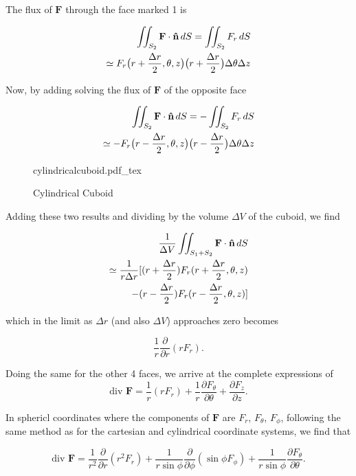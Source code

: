 \documentclass[11pt]{article}
\newcommand{\incfig}[2][1]{%
    \def\svgwidth{#1\columnwidth}
    {#2.pdf_tex}
}
\begin{document}
The flux of $\mathbf{F}$ through the face marked 1 is

\begin{align}
	 \iint_{S_2} \mathbf{F} \cdot \mathbf{\hat{n}} \, dS = \iint_{S_2}F_r \, dS \notag\\
	 \simeq F_r \bigl(r+ \frac{\Delta r}{2}, \theta, z \bigr)\bigl(r+\frac{\Delta r}{2}\bigr) \Delta \theta \Delta z
\end{align}

 Now, by adding solving the flux of $\mathbf{F}$ of the opposite face

\begin{align}
	\iint_{S_2} \mathbf{F} \cdot \mathbf{\hat{n}} \, dS = -\iint_{S_2}F_r \, dS \notag\\
	 \simeq -F_r \bigl(r - \frac{\Delta r}{2}, \theta, z \bigr)\bigl(r - \frac{\Delta r}{2}\bigr) \Delta \theta \Delta z
\end{align}

\begin{figure}[ht]
	\centering
	\incfig{cylindricalcuboid}
	\caption{Cylindrical Cuboid}
	\label{fig:cylindricalcuboid}
\end{figure}

Adding these two results and dividing by the volume $\Delta V$ of the cuboid, we find

\begin{align}
	\frac{1}{\Delta V} \iint_{S_1+S_2} \mathbf{F} \cdot \mathbf{\hat{n}} \, dS \notag\\
	\simeq \frac{1}{r\Delta r} [(r+\frac{\Delta r}{2})F_r(r+\frac{\Delta r}{2}, \theta, z) \\
	-(r-\frac{\Delta r}{2})F_r(r-\frac{\Delta r}{2}, \theta,z)]
\end{align}

which in the limit as $\Delta r$ (and also $\Delta V$) approaches zero becomes

\[
\frac{1}{r}\frac{\partial}{\partial r}(rF_r)
.\]

Doing the same for the other 4 faces, we arrive at the complete expressions of
\[
	\text{div } \mathbf{F} = \frac{1}{r}(rF_r) + \frac{1}{r}\frac{\partial F_\theta}{\partial \theta} + \frac{\partial F_z}{\partial z}
.\]

In sphericl coordinates where the components of $\mathbf{F}$ are $F_r$, $F_\theta$, $F_\phi$, following the same method as for the cartesian and cylindrical coordinate systems, we find that

\[
	\text{div } \mathbf{F} = \frac{1}{r^2} \frac{\partial}{\partial r}(r^2F_r) + \frac{1}{r \sin \phi} \frac{\partial}{\partial \phi} (\sin \phi F_\phi) + \frac{1}{r \sin \phi}\frac{\partial F_\theta}{\partial \theta}
.\]
\end{document}

